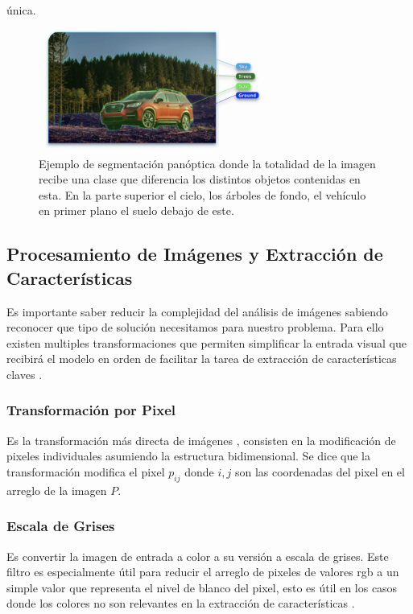 \documentclass[letter,12pt]{report}
\begin{document}
\begin{itemize}
        única.
        \begin{figure}[H]
            \centering
            \includegraphics[width=0.7\textwidth]{segment}
            \caption{Ejemplo de segmentación panóptica donde la totalidad de la imagen
                recibe una clase que diferencia los distintos objetos contenidas en esta. En
                la parte superior el cielo, los árboles de fondo, el vehículo en primer plano el
            suelo debajo de este.}
            \label{fig:segment}
        \end{figure} 
\end{itemize}

\subsection{Procesamiento de Imágenes y Extracción de Características}
Es importante saber reducir la complejidad del análisis de imágenes sabiendo reconocer
que tipo de solución necesitamos para nuestro problema. Para ello existen multiples
transformaciones que permiten simplificar la entrada visual que recibirá el modelo en
orden de facilitar la tarea de extracción de características claves \cite{Prince}.

\subsubsection{Transformación por Pixel}
Es la transformación más directa de imágenes \cite{Pixel}, consisten en la modificación de
pixeles individuales asumiendo la estructura bidimensional. Se dice que la transformación
modifica el pixel $p_{ij}$ donde $i, j$ son las coordenadas del pixel en el arreglo de la
imagen $P$.

\subsubsection{Escala de Grises}
Es convertir la imagen de entrada a color a su versión a escala de grises. Este filtro es
especialmente útil para reducir el arreglo de pixeles de valores rgb a un simple valor
que representa el nivel de blanco del pixel, esto es útil en los casos donde los colores
no son relevantes en la extracción de características \cite{Pixel}.
\end{document}
